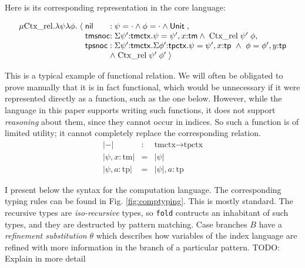 \documentclass{article}
\newcommand{\LONGVERSION}[1]{{\color{light-gray}#1}}
\begin{document}
Here is its corresponding representation in the core language: 

\[
\begin{array}{r@{\;}c@{\;}l@{}l}
\mu \text{Ctx\_rel}. \lambda \psi\lambda \phi. & \langle & \m{nil}\; &:  \psi
= \cdot \andalso \phi = \cdot \andalso \tunit\;, \\
&  & \m{tmsnoc} & : \Sigma \psi'{:}{\m{tmctx}}. \psi = \psi', x{:}\m{tm}
\andalso\;\text{Ctx\_rel}\;\psi'\;\phi ,\\
&  & \m{tpsnoc} & : \Sigma \psi'{:}{\m{tmctx}}. \Sigma
\phi'{:}{\m{tpctx}}. \psi = \psi', x{:}\m{tp} ~\andalso~ \phi = \phi',
y{:}\m{tp} \\
&&& \andalso\;\text{Ctx\_rel}\;\psi'\;\phi' \;\rangle 
\end{array}
\]

This is a typical example of
functional relation. We will often be obligated to prove manually
that it is in fact functional, which would be unnecessary if it
were represented directly as a function, such as the one
below. However, while the language in this paper supports writing such
functions, it does not support \emph{reasoning} about them, since they
cannot occur in indices. So such a function is of limited
utility; it cannot completely replace the corresponding relation.
\begin{eqnarray*}
|-| & : & \text{tmctx} \rightarrow \text{tpctx} \\
| \psi , x:\text{tm} | & = & | \psi | \\
| \psi , a:\text{tp} | & = & | \psi | , a:\text{tp}
\end{eqnarray*}

I present below the syntax for the computation language. The
corresponding typing rules can be found in Fig. \ref{fig:comptyping}. This
is mostly standard. The recursive types are \emph{iso-recursive}
types, so \lstinline{fold} contructs an inhabitant of such types, and
they are destructed by pattern matching. Case branches $B$ have a
\emph{refinement substitution} $\theta$ which describes how variables
of the index language are refined with more information in the branch
of a particular pattern. \LONGVERSION{TODO: Explain in more detail}
\end{document}
